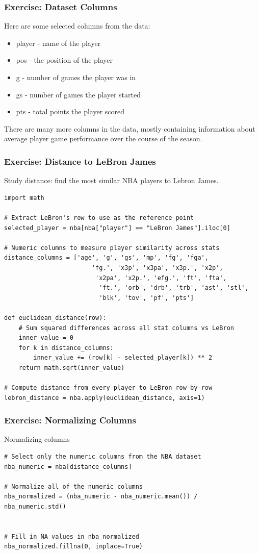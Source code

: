 \begin{frame}[fragile]\frametitle{Exercise: Dataset Columns}
Here are some selected columns from the data:
\begin{itemize}
\item     player - name of the player
\item     pos - the position of the player
\item     g - number of games the player was in
\item     gs - number of games the player started
\item     pts - total points the player scored
\end{itemize}
There are many more columns in the data, mostly containing information about average player game performance over the course of the season.
\end{frame}

\begin{frame}[fragile]\frametitle{Exercise: Distance to LeBron James}
Study distance: find the most similar NBA players to Lebron James.
\begin{lstlisting}
import math

# Extract LeBron's row to use as the reference point
selected_player = nba[nba["player"] == "LeBron James"].iloc[0]

# Numeric columns to measure player similarity across stats
distance_columns = ['age', 'g', 'gs', 'mp', 'fg', 'fga',
						'fg.', 'x3p', 'x3pa', 'x3p.', 'x2p',
						 'x2pa', 'x2p.', 'efg.', 'ft', 'fta',
						  'ft.', 'orb', 'drb', 'trb', 'ast', 'stl',
						  'blk', 'tov', 'pf', 'pts']

def euclidean_distance(row):
    # Sum squared differences across all stat columns vs LeBron
    inner_value = 0
    for k in distance_columns:
        inner_value += (row[k] - selected_player[k]) ** 2
    return math.sqrt(inner_value)

# Compute distance from every player to LeBron row-by-row
lebron_distance = nba.apply(euclidean_distance, axis=1)
\end{lstlisting}
\end{frame}

\begin{frame}[fragile]\frametitle{Exercise: Normalizing Columns}
Normalizing columns
\begin{lstlisting}
# Select only the numeric columns from the NBA dataset
nba_numeric = nba[distance_columns]

# Normalize all of the numeric columns
nba_normalized = (nba_numeric - nba_numeric.mean()) / nba_numeric.std()


# Fill in NA values in nba_normalized
nba_normalized.fillna(0, inplace=True)
\end{lstlisting}
\end{frame}


